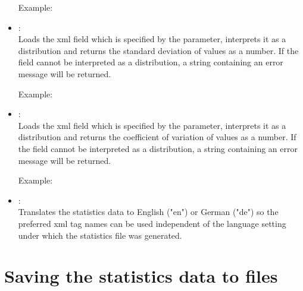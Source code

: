 \begin{itemize}
Example:\\
  
\item
{}:\\
Loads the xml field which is specified by the parameter, interprets it as a distribution and
returns the standard deviation of values as a number.
If the field cannot be interpreted as a distribution, a string containing an error message will be returned.

Example:\\

\item
{}:\\
Loads the xml field which is specified by the parameter, interprets it as a distribution and
returns the coefficient of variation of values as a number.
If the field cannot be interpreted as a distribution, a string containing an error message will be returned.
	
Example:\\

\item
{}:\\
Translates the statistics data to English ("{}en") or German ("{}de") so the preferred xml tag names can be
used independent of the language setting under which the statistics file was generated.

\end{itemize}

\section{Saving the statistics data to files}

